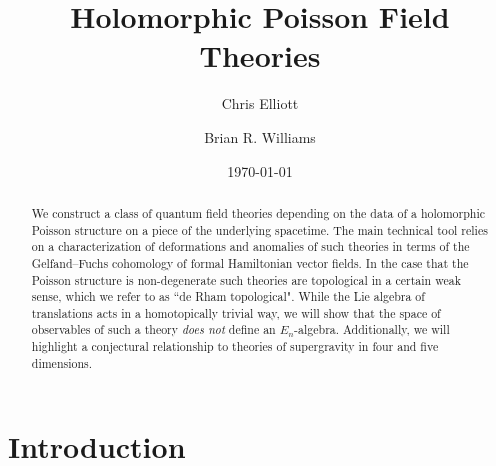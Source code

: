 \documentclass[11pt, oneside, reqno]{amsart}
\title{Holomorphic Poisson Field Theories}
\author{Chris Elliott}
\author{Brian R. Williams}
\date{\today}
\theoremstyle{definition} \newtheorem{definition}{Definition}[section]
\theoremstyle{definition}
\theoremstyle{remark}
\theoremstyle{definition} \newtheorem{remark}[definition]{Remark}
\theoremstyle{definition} \newtheorem{remarks}[definition]{Remarks}
\theoremstyle{definition} \newtheorem{question}[definition]{Question}
\theoremstyle{definition} \newtheorem*{note}{Note}
\theoremstyle{definition} \newtheorem{example}[definition]{Example}
\theoremstyle{definition} \newtheorem{examples}[definition]{Examples}
\begin{document}
\begin{abstract}
We construct a class of quantum field theories depending on the data of a holomorphic Poisson structure on a piece of the underlying spacetime. 
The main technical tool relies on a characterization of deformations and anomalies of such theories in terms of the Gelfand--Fuchs cohomology of formal Hamiltonian vector fields.
In the case that the Poisson structure is non-degenerate such theories are topological in a certain weak sense, which we refer to as ``de Rham topological". 
While the Lie algebra of translations acts in a homotopically trivial way, we will show that the space of observables of such a theory {\em does not} define an $E_n$-algebra. 
Additionally, we will highlight a conjectural relationship to theories of supergravity in four and five dimensions. 
\end{abstract}

\maketitle

\section{Introduction}
\end{document}
